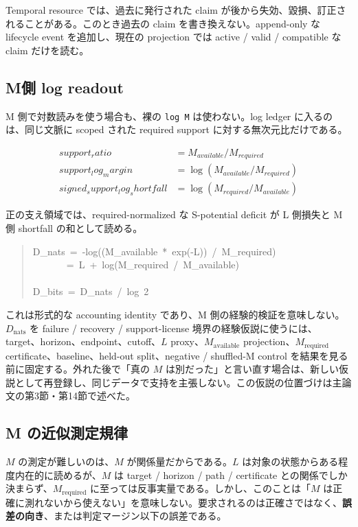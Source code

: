 \documentclass[12pt,a4paper]{article}
\begin{document}
Temporal resource では、過去に発行された claim が後から失効、毀損、訂正されることがある。このとき過去の claim を書き換えない。append-only な lifecycle event を追加し、現在の projection では active / valid / compatible な claim だけを読む。

\subsection{M側 log readout}\label{mux5074-log-readout}

M 側で対数読みを使う場合も、裸の \texttt{log\ M} は使わない。log ledger に入るのは、同じ文脈に scoped された required support に対する無次元比だけである。

\[
\begin{aligned}
support_ratio &= M_{available} / M_{required} \\
support_log_margin &= \log(M_{available} / M_{required}) \\
signed_support_log_shortfall &= \log(M_{required} / M_{available})
\end{aligned}
\]

正の支え領域では、required-normalized な S-potential deficit が L 側損失と M 側 shortfall の和として読める。

\begin{quote}
{\small\ttfamily\noindent
D\_nats~=~-log((M\_available~*~exp(-L))~/~M\_required) \\~~~~~~~=~L~+~log(M\_required~/~M\_available) \\~ \\D\_bits~=~D\_nats~/~log~2
}
\end{quote}

これは形式的な accounting identity であり、M 側の経験的検証を意味しない。\(D_{\mathrm{nats}}\) を failure / recovery / support-license 境界の経験仮説に使うには、target、horizon、endpoint、cutoff、\(L\) proxy、\(M_{\mathrm{available}}\) projection、\(M_{\mathrm{required}}\) certificate、baseline、held-out split、negative / shuffled-M control を結果を見る前に固定する。外れた後で「真の \(M\) は別だった」と言い直す場合は、新しい仮説として再登録し、同じデータで支持を主張しない。この仮説の位置づけは主論文の第3節・第14節で述べた。

\subsection{M の近似測定規律}\label{m-ux306eux8fd1ux4f3cux6e2cux5b9aux898fux5f8b}

\(M\) の測定が難しいのは、\(M\) が関係量だからである。\(L\) は対象の状態からある程度内在的に読めるが、\(M\) は target / horizon / path / certificate との関係でしか決まらず、\(M_{\mathrm{required}}\) に至っては反事実量である。しかし、このことは「\(M\) は正確に測れないから使えない」を意味しない。要求されるのは正確さではなく、\textbf{誤差の向き}、または判定マージン以下の誤差である。
\end{document}
